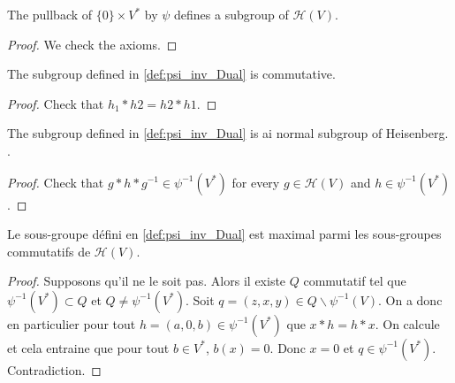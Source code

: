 \begin{definition}[$\psi^{-1}(V)$]
    \label{def:psi_inv_Dual}
    \leanok 

    The pullback of $\{0\}\times V^*$ by $\psi$ defines a subgroup of $\mathcal{H}(V)$.
    \begin{proof}
        \leanok
        We check the axioms.
    \end{proof}
\end{definition}
    
\begin{proposition}
    \label{prop:psi_inv_Dual_comm}
    \leanok

    The subgroup defined in \ref{def:psi_inv_Dual} is commutative.
    \begin{proof}
        \leanok
        Check that $h_1*h2=h2*h1$.
    \end{proof}
\end{proposition}

\begin{proposition}
    \label{prop:psi_inv_Dual_normal}
    \leanok

    The subgroup defined in \ref{def:psi_inv_Dual} is ai normal subgroup of Heisenberg. .
    \begin{proof}
        \leanok 
        Check that $g*h*g^{-1}\in \psi^{-1}(V^*)$ for every $g\in \mathcal{H}(V)$ and $h\in \psi^{-1}(V^*)$.
    \end{proof}
\end{proposition}

\begin{proposition}
    \label{prop:psi_inv_Dual_max}
    \leanok

    Le sous-groupe défini en \ref{def:psi_inv_Dual} est maximal parmi les sous-groupes
    commutatifs de $\mathcal{H}(V)$.
    \begin{proof}
        \leanok 
        Supposons qu'il ne le soit pas. Alors il existe $Q$ commutatif tel que
        $\psi^{-1}(V^*)\subset Q$ et $Q\ne \psi^{-1}(V^*)$. Soit $q=(z,x,y)\in Q\backslash \psi^{-1}(V)$.
        On a donc en particulier pour tout $h=(a,0,b)\in \psi^{-1}(V^*)$ que $x*h=h*x$. On 
        calcule et cela entraine que pour tout $b\in V^*$, $b(x)=0$. Donc $x=0$ et $q\in \psi^{-1}(V^*)$.
        Contradiction.
    \end{proof}
\end{proposition}
